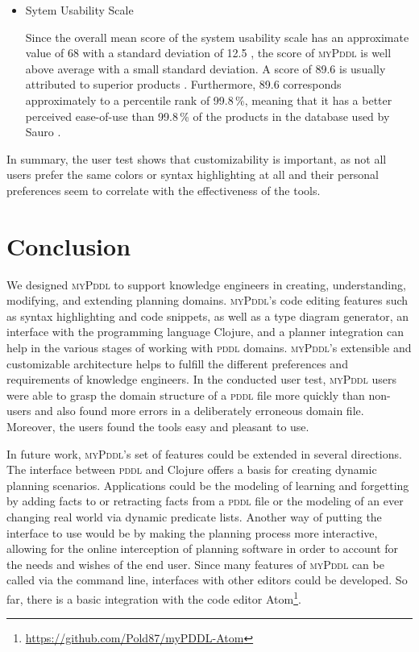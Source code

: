 \documentclass[runningheads]{llncs}
\newcommand{\mypddl}{\textsc{myPddl}\xspace}
\newcommand{\pddl}{\textsc{pddl}\xspace}
\begin{document}
\begin{itemize}
\item Sytem Usability Scale

Since the overall mean score of the system usability scale has an
approximate value of 68 with a standard deviation of 12.5
\cite{sauro2011practical}, the score of \mypddl is well above average
with a small standard deviation. A score of 89.6 is usually attributed
to superior products \cite{bangor2008empirical}. Furthermore, 89.6
corresponds approximately to a percentile rank of 99.8\,\%, meaning
that it has a better perceived ease-of-use than 99.8\,\% of the
products in the database used by Sauro \cite{sauro2011practical}.

\end{itemize}

In summary, the user test shows that customizability is important, as
not all users prefer the same colors or syntax highlighting at all and
their personal preferences seem to correlate with the effectiveness of
the tools.

\section{Conclusion}
\label{sec:conclusion}

We designed \mypddl to support knowledge engineers in creating,
understanding, modifying, and extending planning domains. \mypddl's
code editing features such as syntax highlighting and code snippets,
as well as a type diagram generator, an interface with the programming
language Clojure, and a planner integration can help in the various
stages of working with \pddl domains. \mypddl's extensible and
customizable architecture helps to fulfill the different preferences
and requirements of knowledge engineers. In the conducted user test,
\mypddl users were able to grasp the domain structure of a \pddl file
more quickly than non-users and also found more errors in a
deliberately erroneous domain file. Moreover, the users found the
tools easy and pleasant to use.

In future work, \mypddl's set of features could be extended in several
directions. The interface between \pddl and Clojure offers a basis for
creating dynamic planning scenarios. Applications could be the
modeling of learning and forgetting by adding facts to or retracting
facts from a \pddl file or the modeling of an ever changing real world
via dynamic predicate lists. Another way of putting the interface to
use would be by making the planning process more interactive, allowing
for the online interception of planning software in order to account
for the needs and wishes of the end user. Since many features of
\mypddl can be called via the command line, interfaces with other
editors could be developed. So far, there is a basic integration with
the code editor
Atom\footnote{\url{https://github.com/Pold87/myPDDL-Atom}}.
\end{document}
